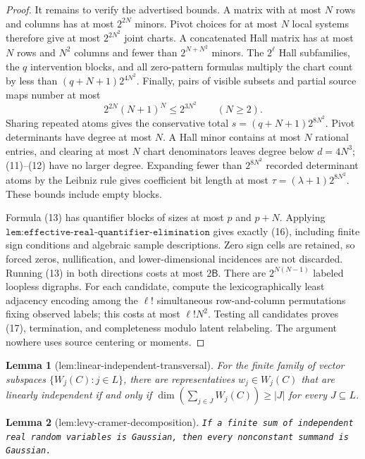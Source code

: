 \documentclass{article}
\newtheorem{lemma}{Lemma}
\begin{document}
\begin{proof}
It remains to verify the advertised bounds. A matrix with at most \(N\) rows and columns has at most \(2^{2N}\) minors. Pivot choices for at most \(N\) local systems therefore give at most \(2^{2N^2}\) joint charts. A concatenated Hall matrix has at most \(N\) rows and \(N^2\) columns and fewer than \(2^{N+N^2}\) minors. The \(2^\ell\) Hall subfamilies, the \(q\) intervention blocks, and all zero-pattern formulas multiply the chart count by less than \((q+N+1)2^{4N^2}\). Finally, pairs of visible subsets and partial source maps number at most
\[
2^{2N}(N+1)^N\le 2^{3N^2}\qquad(N\ge2).
\]
Sharing repeated atoms gives the conservative total \(s=(q+N+1)2^{8N^2}\). Pivot determinants have degree at most \(N\). A Hall minor contains at most \(N\) rational entries, and clearing at most \(N\) chart denominators leaves degree below \(d=4N^3\); (11)--(12) have no larger degree. Expanding fewer than \(2^{8N^2}\) recorded determinant atoms by the Leibniz rule gives coefficient bit length at most \(\tau=(\lambda+1)2^{8N^2}\). These bounds include empty blocks.

Formula (13) has quantifier blocks of sizes at most \(p\) and \(p+N\). Applying \(\texttt{lem:effective-real-quantifier-elimination}\) gives exactly (16), including finite sign conditions and algebraic sample descriptions. Zero sign cells are retained, so forced zeros, nullification, and lower-dimensional incidences are not discarded. Running (13) in both directions costs at most \(2\mathsf B\). There are \(2^{N(N-1)}\) labeled loopless digraphs. For each candidate, compute the lexicographically least adjacency encoding among the \(\ell!\) simultaneous row-and-column permutations fixing observed labels; this costs at most \(\ell!N^2\). Testing all candidates proves (17), termination, and completeness modulo latent relabeling. The argument nowhere uses source centering or moments.
\end{proof}

\begin{lemma}[lem:linear-independent-transversal]\label{lem:linear-independent-transversal}
For the finite family of vector subspaces \(\{W_j(C):j\in L\}\), there are representatives \(w_j\in W_j(C)\) that are linearly independent if and only if \(\dim(\sum_{j\in J}W_j(C))\geq |J|\) for every \(J\subseteq L\).
\end{lemma}

\begin{lemma}[lem:levy-cramer-decomposition]\label{lem:levy-cramer-decomposition}
\texttt{If a finite sum of independent real random variables is Gaussian,\allowbreak{} then every nonconstant summand is Gaussian.}
\end{lemma}
\end{document}
